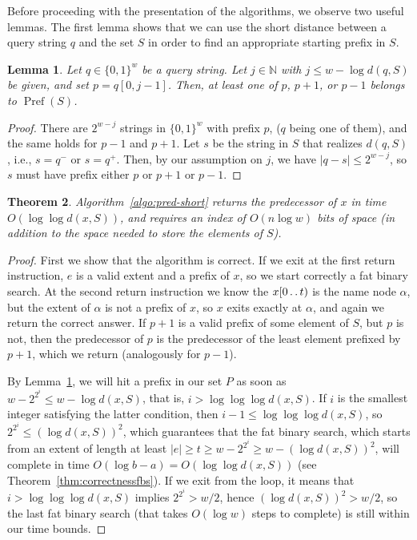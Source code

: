 \documentclass[a4paper,11pt]{article}
\newtheorem{theorem}{Theorem}[section]
\newtheorem{lemma}[theorem]{Lemma}
\newcommand{\N}{\mathbb{N}}
\newcommand{\?}{\mskip1.5mu}
\def\..{\,\mathpunct{\ldotp\ldotp}} %
\DeclareMathOperator{\Pref}{Pref}
\begin{document}
Before proceeding with the presentation of the algorithms, we
observe two useful lemmas. The first lemma shows that we can
use the short distance between a query string $q$ and the 
set $S$ in order to find an appropriate starting prefix in $S$. 
\begin{lemma}
\label{lemma:hitpref}
Let $q \in \{0, 1\}^w$ be a query string.
Let $j \in \N$ with $j \leq w-\log d(q,S)$ be given, 
and set $p=q[0,j - 1]$. 
Then, at least one of $p$, $p+1$, or $p-1$ 
belongs to $\Pref(S)$. 
\end{lemma}

\begin{proof}
There are $2^{w-j}$ strings in $\{0, 1\}^w$
with prefix $p$, ($q$ being one of them), and the same holds
for $p - 1$ and $p + 1$. 
Let $s$ be the string in $S$ that realizes
$d(q, S)$, i.e., $s = q^-$ or $ s = q^+$.
Then, by our assumption on $j$, we have $|q-s| \leq 2^{w-j}$, 
so $s$ must have prefix either $p$ or $p + 1$ or $p-1$.
\end{proof}


\begin{theorem}
Algorithm~\ref{algo:pred-short} returns the predecessor of $x$
in time $O(\log\log d(x,S))$, and requires an index of $O(n \log w )$
bits of space (in addition to the space needed to store the elements of $S$).
\end{theorem}
\begin{proof}
First we show that the algorithm is correct. If we exit at the first return
instruction, $e$ is a valid extent and a prefix of $x$, so we start correctly a
fat binary search. At the second return instruction we know the $x[0\..t)$ is
the name node $\alpha$, but the extent of $\alpha$ is not a prefix of $x$, so
$x$ exits exactly at $\alpha$, and again we return the correct answer. If $p+1$ is a valid prefix of some element of $S$, but $p$ is not, then the predecessor
of $p$ is the predecessor of the least element prefixed by $p+1$, which we
return (analogously for $p-1$).

By Lemma~\ref{lemma:hitpref}, we will hit a prefix in our set $P$ as soon as
$w-2^{2^i}\leq w-\log d(x,S)$, that is, $i>\log\log\log d(x,S)$. If $i$ is the
smallest integer satisfying the latter condition, then $i-1\leq \log\log\log
d(x,S)$, so $2^{2^i}\leq (\log d(x,S))^2$, which guarantees that the fat binary
search, which starts from an extent of length at least $|e| \geq t \geq
w-2^{2^i} \geq w-(\log d(x,S))^2$, will complete in time $O(\log
b-a)=O(\log\log d(x,S))$ (see Theorem~\ref{thm:correctnessfbs}). If we exit from the loop,
it means that $i>\log\log\log d(x,S)$ implies $2^{2^i}>w/2$, hence
$(\log d(x,S))^2>w/2$, so the last fat binary search (that takes $O(\log w)$
steps to complete) is still within our time bounds.
\end{proof}
\end{document}
